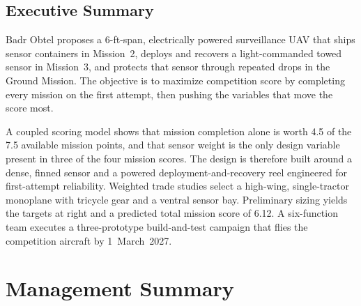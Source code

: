\documentclass{dbfdoc}
\begin{document}
\begin{frontmatter}
\section{Executive Summary}
\noindent\begin{minipage}[t]{0.605\textwidth}
\setlength\parindent{1.15em}\noindent
Badr Obtel proposes a 6-ft-span, electrically powered surveillance UAV that ships sensor containers in Mission~2, deploys and recovers a light-commanded towed sensor in Mission~3, and protects that sensor through repeated drops in the Ground Mission. The objective is to maximize competition score by completing every mission on the first attempt, then pushing the variables that move the score most.

A coupled scoring model shows that mission completion alone is worth 4.5 of the 7.5 available mission points, and that sensor weight is the only design variable present in three of the four mission scores. The design is therefore built around a dense, finned sensor and a powered deployment-and-recovery reel engineered for first-attempt reliability. Weighted trade studies select a high-wing, single-tractor monoplane with tricycle gear and a ventral sensor bay. Preliminary sizing yields the targets at right and a predicted total mission score of 6.12. A six-function team executes a three-prototype build-and-test campaign that flies the competition aircraft by 1~March~2027.
\end{minipage}\hfill
\begin{minipage}[t]{0.365\textwidth}
\vspace{-11pt}
\begin{dbfpanel}
\par\vspace{6pt}
\hfill{}\dbfreadoutgap
{}\hfill{}\dbfreadoutgap
{}\hfill{}\dbfreadoutgap
{}\hfill{}
\end{dbfpanel}
\end{minipage}
\end{frontmatter}

\section{Management Summary}
\end{document}
